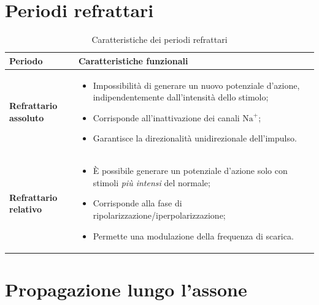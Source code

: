 \documentclass[11pt,a4paper,italian,twoside]{report}
\theoremstyle{definition} %
\begin{document}
\section{Periodi refrattari}
\label{sec:refrattari}

\begin{table}[htbp]
  \centering
  \caption{Caratteristiche dei periodi refrattari}
  \label{tab:refrattari}
  \begin{tabularx}{\textwidth}{l X}
    \toprule
    \textbf{Periodo} & \textbf{Caratteristiche funzionali} \\
    \midrule
    \textbf{Refrattario assoluto} & 
    \begin{itemize}[leftmargin=1.5em,noitemsep,topsep=0pt,partopsep=0pt]
      \item Impossibilità di generare un nuovo potenziale d'azione, indipendentemente dall'intensità dello stimolo;
      \item Corrisponde all'inattivazione dei canali \(\mathrm{Na}^+\);
      \item Garantisce la direzionalità unidirezionale dell'impulso.
    \end{itemize} \\
    \addlinespace
    \textbf{Refrattario relativo} & 
    \begin{itemize}[leftmargin=1.5em,noitemsep,topsep=0pt,partopsep=0pt]
      \item È possibile generare un potenziale d'azione solo con stimoli \textit{più intensi} del normale;
      \item Corrisponde alla fase di ripolarizzazione/iperpolarizzazione;
      \item Permette una modulazione della frequenza di scarica.
    \end{itemize} \\
    \bottomrule
  \end{tabularx}
\end{table}

\section{Propagazione lungo l'assone}
\label{sec:propagazione}
\end{document}
